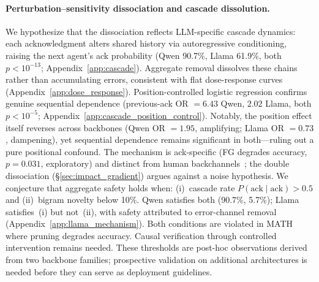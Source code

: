\paragraph{Perturbation--sensitivity dissociation and cascade dissolution.}
We hypothesize that the dissociation reflects LLM-specific cascade dynamics: each acknowledgment alters shared history via autoregressive conditioning, raising the next agent's ack probability (Qwen 90.7\%, Llama 61.9\%, both $p < 10^{-13}$; Appendix~\ref{app:cascade}). Aggregate removal dissolves these chains rather than accumulating errors, consistent with flat dose-response curves (Appendix~\ref{app:dose_response}). Position-controlled logistic regression confirms genuine sequential dependence (previous-ack OR $= 6.43$ Qwen, $2.02$ Llama, both $p < 10^{-5}$; Appendix~\ref{app:cascade_position_control}). Notably, the position effect itself reverses across backbones (Qwen OR $= 1.95$, amplifying; Llama OR $= 0.73$, dampening), yet sequential dependence remains significant in both---ruling out a pure positional confound. The mechanism is ack-specific (FG degrades accuracy, $p = 0.031$, exploratory) and distinct from human backchannels~\cite{bavelas_co_narrators_2000}; the double dissociation (\S\ref{sec:impact_gradient}) argues against a noise hypothesis.
We conjecture that aggregate safety holds when: (i)~cascade rate $P(\text{ack} \mid \text{ack}) > 0.5$ and (ii)~bigram novelty below 10\%. Qwen satisfies both (90.7\%, 5.7\%); Llama satisfies~(i) but not~(ii), with safety attributed to error-channel removal (Appendix~\ref{app:llama_mechanism}). Both conditions are violated in MATH where pruning degrades accuracy. Causal verification through controlled intervention remains needed. These thresholds are post-hoc observations derived from two backbone families; prospective validation on additional architectures is needed before they can serve as deployment guidelines.

